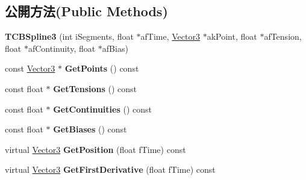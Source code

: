 \subsection*{公開方法(Public Methods)}
\begin{DoxyCompactItemize}
\item 
{\bfseries T\+C\+B\+Spline3} (int i\+Segments, float $\ast$af\+Time, \hyperlink{class_i_dream_sky_1_1_vector3}{Vector3} $\ast$ak\+Point, float $\ast$af\+Tension, float $\ast$af\+Continuity, float $\ast$af\+Bias)\hypertarget{class_i_dream_sky_1_1_t_c_b_spline3_ad4251b318c31e22b6903404ade8de963}{}\label{class_i_dream_sky_1_1_t_c_b_spline3_ad4251b318c31e22b6903404ade8de963}

\item 
const \hyperlink{class_i_dream_sky_1_1_vector3}{Vector3} $\ast$ {\bfseries Get\+Points} () const \hypertarget{class_i_dream_sky_1_1_t_c_b_spline3_aa54dc45b97858959f33ceb1b67fb29b4}{}\label{class_i_dream_sky_1_1_t_c_b_spline3_aa54dc45b97858959f33ceb1b67fb29b4}

\item 
const float $\ast$ {\bfseries Get\+Tensions} () const \hypertarget{class_i_dream_sky_1_1_t_c_b_spline3_a438dd93da3a8a0fed5c6ec86a570af1a}{}\label{class_i_dream_sky_1_1_t_c_b_spline3_a438dd93da3a8a0fed5c6ec86a570af1a}

\item 
const float $\ast$ {\bfseries Get\+Continuities} () const \hypertarget{class_i_dream_sky_1_1_t_c_b_spline3_a38f08a6cca213b1f8d8b5de535e7b97f}{}\label{class_i_dream_sky_1_1_t_c_b_spline3_a38f08a6cca213b1f8d8b5de535e7b97f}

\item 
const float $\ast$ {\bfseries Get\+Biases} () const \hypertarget{class_i_dream_sky_1_1_t_c_b_spline3_a10f336e6afd04347167e0312aba25dd4}{}\label{class_i_dream_sky_1_1_t_c_b_spline3_a10f336e6afd04347167e0312aba25dd4}

\item 
virtual \hyperlink{class_i_dream_sky_1_1_vector3}{Vector3} {\bfseries Get\+Position} (float f\+Time) const \hypertarget{class_i_dream_sky_1_1_t_c_b_spline3_afda0e37e122f1adb2f9f9c06a71a3f66}{}\label{class_i_dream_sky_1_1_t_c_b_spline3_afda0e37e122f1adb2f9f9c06a71a3f66}

\item 
virtual \hyperlink{class_i_dream_sky_1_1_vector3}{Vector3} {\bfseries Get\+First\+Derivative} (float f\+Time) const \hypertarget{class_i_dream_sky_1_1_t_c_b_spline3_a42cf9e94bf8e344319ee6f95719ffd59}{}\label{class_i_dream_sky_1_1_t_c_b_spline3_a42cf9e94bf8e344319ee6f95719ffd59}


\end{DoxyCompactItemize}

